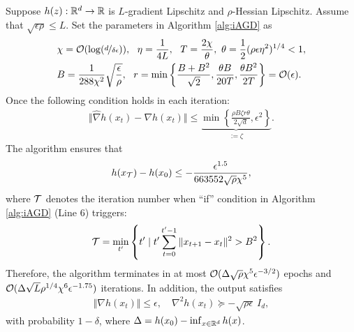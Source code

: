 \begin{thm}
    \label{thm:iAGD}
Suppose $h(z): {\mathbb{R}}^d \rightarrow {\mathbb{R}}$ is
$L$-gradient Lipschitz and $\rho$-Hessian Lipschitz. Assume that $\sqrt{\epsilon \rho } \le L$.
Set the parameters in Algorithm \ref{alg:iAGD} as 
\begin{align*}
    &\chi = {\mathcal{O}}( \log (\nicefrac{d}{\delta \epsilon})),~~ \eta = \frac{1}{4 L}, ~~ T = \frac{2 \chi}{\theta}, ~ \theta = \frac{1}{2} ( \rho \epsilon \eta^2 )^{1/4}<1,\\
    & B = \frac{1}{288 \chi^2} \sqrt{\frac{\epsilon}{\rho}}, ~~ 
     r =\min \left\{ \frac{B + B^2}{\sqrt{2}}, \frac{\theta B}{20 T}, \frac{\theta B^2}{2T} \right\} = {\mathcal{O}}(\epsilon).
\end{align*}
Once the following condition holds in each iteration:
\begin{align} \label{cond:RAGD}
     \Vert \hat \nabla h(x_t) - \nabla h(x_t) \Vert \le \underbrace{\min \left\{ \frac{\rho B \zeta r \theta}{2 \sqrt{d}}, \epsilon^2 \right\}}_{:=\zeta}.
\end{align}
The algorithm ensures that
\begin{align} \label{eq:des-AGD}
    h(x_{{\mathcal{T}}}) - h(x_0) \le - \frac{\epsilon^{1.5}}{663552 \sqrt{\rho} \chi^5},
\end{align}
where ${\mathcal{T}}$ denotes the iteration number when ``if'' condition in Algorithm \ref{alg:iAGD} (Line 6) triggers:
\begin{align*}
{\mathcal{T}} = \min_{t'} \left\{ t' \mid t' \sum_{t=0}^{t'-1} \Vert x_{t+1} - x_t \Vert^2 > B^2 \right\}.
\end{align*}
Therefore, the algorithm terminates in at most ${\mathcal{O}}(\Delta \sqrt{\rho} \chi^5 \epsilon^{-3/2})$ epochs and $ {\mathcal{O}}( \Delta \sqrt{L} \rho^{1/4} \chi^6 \epsilon^{-1.75})$ iterations. In addition, the output satisfies
\begin{align*}
    \Vert \nabla h(x_t) \Vert \le \epsilon, \quad  \nabla^2 h(x_t)  \succeq - \sqrt{\rho \epsilon}~ I_{d}, 
\end{align*}
with probability $1-\delta$, where
$\Delta = h(x_0) - \inf_{x \in {\mathbb{R}}^{d}} h(x)$.    
\end{thm}

